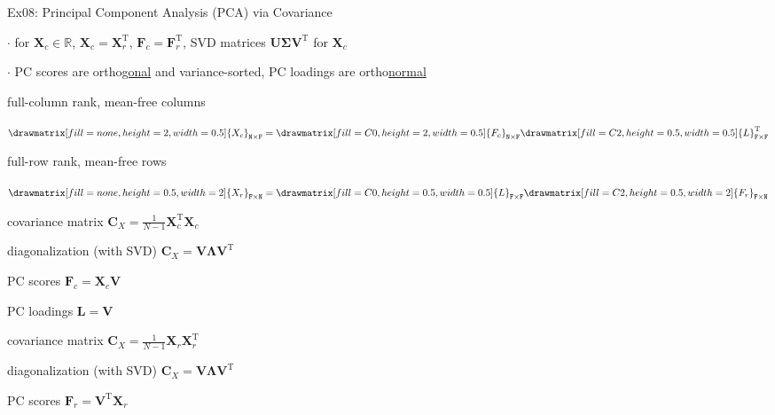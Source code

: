 \documentclass[mathserif, aspectratio=1610]{intbeamer}
\begin{document}
\begin{frame}[t]{Ex08: Principal Component Analysis (PCA) via Covariance}

$\cdot$ for $\bm{X}_c \in\mathbb{R}$, $\bm{X}_c = \bm{X}_r^\mathrm{T}$, $\bm{F}_c = \bm{F}_r^\mathrm{T}$, SVD matrices $\bm{U} \bm{\Sigma} \bm{V}^\mathrm{T}$ for $\bm{X}_c$

$\cdot$ PC scores are ortho\underline{gonal} and variance-sorted, PC loadings are ortho\underline{normal}

\vspace{0.5em}
\begin{minipage}[t]{0.49\textwidth}
full-column rank, mean-free columns
\begin{center}
$
\def\F{0.5}
\def\N{2}
\drawmatrix[fill=none, height=\N, width=\F]{X_{c}}_\mathtt{N \times F}
=
\drawmatrix[fill=C0, height=\N, width=\F]{F_{c}}_\mathtt{N \times F}
\drawmatrix[fill=C2, height=\F, width=\F]{L}_\mathtt{F \times F}^\mathrm{T}
$
\end{center}
\end{minipage}
%
\begin{minipage}[t]{0.49\textwidth}
full-row rank, mean-free rows
\begin{center}
$
\def\F{0.5}
\def\N{2}
\drawmatrix[fill=none, height=\F, width=\N]{X_{r}}_\mathtt{F \times N}
=
\drawmatrix[fill=C0, height=\F, width=\F]{L}_\mathtt{F \times F}
\drawmatrix[fill=C2, height=\F, width=\N]{F_{r}}_\mathtt{F \times N}
$
\end{center}
\end{minipage}

\vspace{0.5em}

\begin{minipage}[t]{0.49\textwidth}
covariance matrix $\bm{C}_X = \frac{1}{N-1}\bm{X}_c^\mathrm{T}\bm{X}_c$

diagonalization (with SVD) $\bm{C}_X = \bm{V} \bm{\Lambda} \bm{V}^\mathrm{T}$

PC scores $\bm{F}_c = \bm{X}_c \bm{V}$

PC loadings $\bm{L} = \bm{V}$

\end{minipage}
%
\begin{minipage}[t]{0.49\textwidth}
covariance matrix $\bm{C}_X = \frac{1}{N-1}\bm{X}_r\bm{X}_r^\mathrm{T}$

diagonalization (with SVD) $\bm{C}_X = \bm{V} \bm{\Lambda} \bm{V}^\mathrm{T}$

PC scores $\bm{F}_r = \bm{V}^\mathrm{T} \bm{X}_r$


\end{minipage}
\end{frame}
\end{document}
